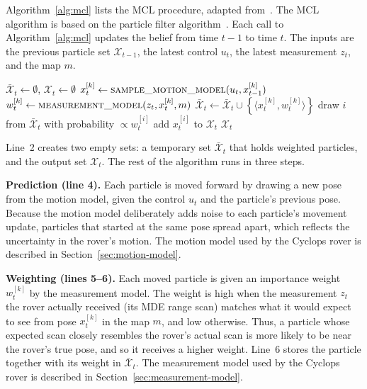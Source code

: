 Algorithm~\ref{alg:mcl} lists the MCL procedure, adapted from~\cite{thrun2005probabilistic}.
The MCL algorithm is based on the particle filter algorithm~\cite{thrun2005probabilistic}.
Each call to Algorithm~\ref{alg:mcl} updates the belief from time $t-1$ to time $t$. The
inputs are the previous particle set $\mathcal{X}_{t-1}$, the latest control $u_t$, the
latest measurement $z_t$, and the map $m$. 

\begin{algorithm}[htbp]
  \caption{Monte Carlo Localization, adapted from Thrun et al.~\cite{thrun2005probabilistic}}
  \label{alg:mcl}
  \begin{algorithmic}[1]
      \State $\bar{\mathcal{X}}_t \gets \emptyset$, \quad $\mathcal{X}_t \gets \emptyset$
        \State $x_t^{[k]} \gets \Call{sample\_motion\_model}{u_t, x_{t-1}^{[k]}}$
        \State $w_t^{[k]} \gets \Call{measurement\_model}{z_t, x_t^{[k]}, m}$
        \State $\bar{\mathcal{X}}_t \gets \bar{\mathcal{X}}_t \cup \left\{ \langle x_t^{[k]}, w_t^{[k]} \rangle \right\}$
      \EndFor
        \State draw $i$ from $\bar{\mathcal{X}}_t$ with probability $\propto w_t^{[i]}$
        \State add $x_t^{[i]}$ to $\mathcal{X}_t$
      \EndFor
      \State \Return $\mathcal{X}_t$
    \EndFunction
  \end{algorithmic}
\end{algorithm}

Line~2 creates two empty sets: a temporary set
$\bar{\mathcal{X}}_t$ that holds weighted particles, and the output set $\mathcal{X}_t$. The
rest of the algorithm runs in three steps.

\textbf{Prediction (line 4).} Each particle is moved forward by drawing a new pose from the
motion model, given the control $u_t$ and the particle's previous pose. Because the motion
model deliberately adds noise to each particle's movement update, particles that started at
the same pose spread apart, which reflects the uncertainty in the rover's motion. The motion model used by the Cyclops rover is described in
Section~\ref{sec:motion-model}.

\textbf{Weighting (lines 5--6).} Each moved particle is given an importance weight
$w_t^{[k]}$ by the measurement model. The weight is high when the measurement $z_t$
 the rover
actually received (its MDE range scan) matches what it would expect to see from pose $x_t^{[k]}$ in the map $m$,
and low otherwise. Thus, a particle whose expected scan closely resembles the rover's actual
scan is more likely to be near the rover's true pose, and so it receives a higher weight.
Line~6 stores the particle together with its weight in
$\bar{\mathcal{X}}_t$. The measurement model used by the Cyclops rover is described in
Section~\ref{sec:measurement-model}.

